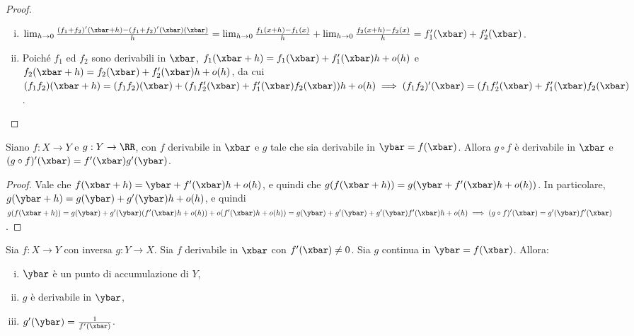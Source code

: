 \documentclass[11pt]{article}
\begin{document}
	\begin{proof}
		\begin{enumerate}[(i)]
			\item $\lim_{h \to 0} \frac{(f_1 + f_2)'(\xbar + h) - (f_1 + f_2)'(\xbar)(\xbar)}{h} = \lim_{h \to 0} \frac{f_1(x+h) - f_1(x)}{h} + \lim_{h \to 0} \frac{f_2(x+h) - f_2(x)}{h} =
			f_1'(\xbar) + f_2'(\xbar)$.
			\item Poiché $f_1$ ed $f_2$ sono derivabili in $\xbar$,
			$f_1(\xbar + h) = f_1(\xbar) + f_1'(\xbar) h + o(h)$ e
			$f_2(\xbar + h) = f_2(\xbar) + f_2'(\xbar) h + o(h)$,
			da cui $(f_1 f_2)(\xbar + h) = (f_1f_2)(\xbar) + (f_1f_2'(\xbar) +
			f_1'(\xbar) f_2(\xbar))h + o(h) \implies (f_1 f_2)'(\xbar) = (f_1f_2'(\xbar) +
			f_1'(\xbar) f_2(\xbar)$.
		\end{enumerate}
	\end{proof}

	\begin{proposition}
		Siano $f : X \to Y$ e $g : Y \to \RR$, con $f$ derivabile in $\xbar$ e $g$ tale che
		sia derivabile in $\ybar = f(\xbar)$. Allora $g \circ f$ è
		derivabile in $\xbar$ e $(g \circ f)'(\xbar) = f'(\xbar) g'(\ybar)$.
	\end{proposition}

	\begin{proof}
		Vale che $f(\xbar + h) = \ybar + f'(\xbar) h + o(h)$, e quindi
		che $g(f(\xbar + h)) = g(\ybar + f'(\xbar) h + o(h))$. In particolare,
		$g(\ybar + h) = g(\ybar) + g'(\ybar) h + o(h)$, e quindi
		$g(f(\xbar + h)) = g(\ybar) + g'(\ybar) (f'(\xbar)h + o(h)) +
		o(f'(\xbar) h + o(h)) = g(\ybar) + g'(\ybar) + g'(\ybar) f'(\xbar) h + o(h) \implies (g \circ f)'(\xbar) = g'(\ybar) f'(\xbar)$.
	\end{proof}

	\begin{proposition}
		Sia $f : X \to Y$ con inversa $g : Y \to X$. Sia $f$ derivabile
		in $\xbar$ con $f'(\xbar) \neq 0$. Sia $g$ continua in $\ybar = f(\xbar)$. Allora:
		
		\begin{enumerate}[(i)]
			\item $\ybar$ è un punto di accumulazione di $Y$,
			\item $g$ è derivabile in $\ybar$,
			\item $g'(\ybar) = \frac{1}{f'(\xbar)}$.
		\end{enumerate}
	\end{proposition}
\end{document}
